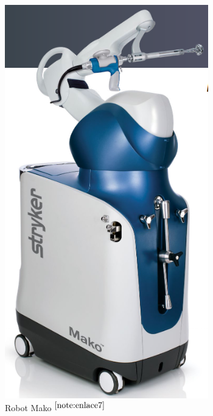 \begin{figure}[ht!]
\begin{minipage}{0.15\linewidth}
		\includegraphics[width=\linewidth]{figs/mako.png}
		\caption*{\centering Robot Mako $^{\ref{note:enlace7}}$}
	\end{minipage}
    \hspace{3cm}
    \begin{minipage}{0.2\linewidth}
    	\centering

\end{minipage}
\end{figure}
